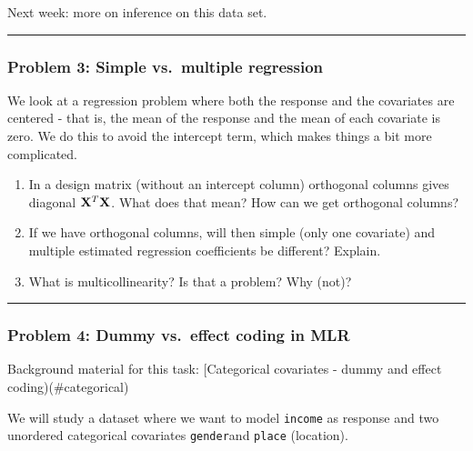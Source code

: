\documentclass[
]{article}
\begin{document}
Next week: more on inference on this data set.

\begin{center}\rule{0.5\linewidth}{0.5pt}\end{center}

\hypertarget{problem-3-simple-vs.-multiple-regression}{%
\subsubsection{Problem 3: Simple vs.~multiple
regression}\label{problem-3-simple-vs.-multiple-regression}}

We look at a regression problem where both the response and the
covariates are centered - that is, the mean of the response and the mean
of each covariate is zero. We do this to avoid the intercept term, which
makes things a bit more complicated.

\begin{enumerate}
\def\labelenumi{\arabic{enumi}.}
\item
  In a design matrix (without an intercept column) orthogonal columns
  gives diagonal \({\bf X}^T {\bf X}\). What does that mean? How can we
  get orthogonal columns?
\item
  If we have orthogonal columns, will then simple (only one covariate)
  and multiple estimated regression coefficients be different? Explain.
\item
  What is multicollinearity? Is that a problem? Why (not)?
\end{enumerate}

\begin{center}\rule{0.5\linewidth}{0.5pt}\end{center}

\hypertarget{problem-4-dummy-vs.-effect-coding-in-mlr}{%
\subsubsection{Problem 4: Dummy vs.~effect coding in
MLR}\label{problem-4-dummy-vs.-effect-coding-in-mlr}}

Background material for this task: {[}Categorical covariates - dummy and
effect coding)(\#categorical)

We will study a dataset where we want to model \texttt{income} as
response and two unordered categorical covariates \texttt{gender}and
\texttt{place} (location).
\end{document}
